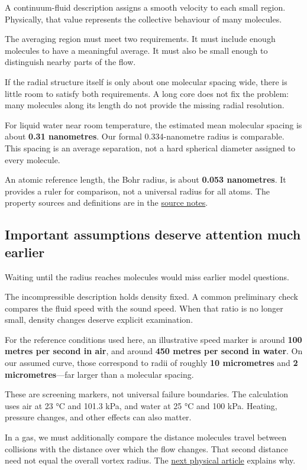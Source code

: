 \documentclass[
  english,
  11pt,
]{article}
\begin{document}
A continuum-fluid description assigns a smooth velocity to each small
region. Physically, that value represents the collective behaviour of
many molecules.

The averaging region must meet two requirements. It must include enough
molecules to have a meaningful average. It must also be small enough to
distinguish nearby parts of the flow.

If the radial structure itself is only about one molecular spacing wide,
there is little room to satisfy both requirements. A long core does not
fix the problem: many molecules along its length do not provide the
missing radial resolution.

For liquid water near room temperature, the estimated mean molecular
spacing is about \textbf{0.31 nanometres}. Our formal 0.334-nanometre
radius is comparable. This spacing is an average separation, not a hard
spherical diameter assigned to every molecule.

An atomic reference length, the Bohr radius, is about \textbf{0.053
nanometres}. It provides a ruler for comparison, not a universal radius
for all atoms. The property sources and definitions are in the
\href{source-notes.md}{source notes}.

\subsection{Important assumptions deserve attention much
earlier}\label{important-assumptions-deserve-attention-much-earlier}

Waiting until the radius reaches molecules would miss earlier model
questions.

The incompressible description holds density fixed. A common preliminary
check compares the fluid speed with the sound speed. When that ratio is
no longer small, density changes deserve explicit examination.

For the reference conditions used here, an illustrative speed marker is
around \textbf{100 metres per second in air}, and around \textbf{450
metres per second in water}. On our assumed curve, those correspond to
radii of roughly \textbf{10 micrometres} and \textbf{2
micrometres}---far larger than a molecular spacing.

These are screening markers, not universal failure boundaries. The
calculation uses air at 23 °C and 101.3 kPa, and water at 25 °C and 100
kPa. Heating, pressure changes, and other effects can also matter.

In a gas, we must additionally compare the distance molecules travel
between collisions with the distance over which the flow changes. That
second distance need not equal the overall vortex radius. The
\href{../d9_regime_map/article.html}{next physical article} explains
why.
\end{document}
